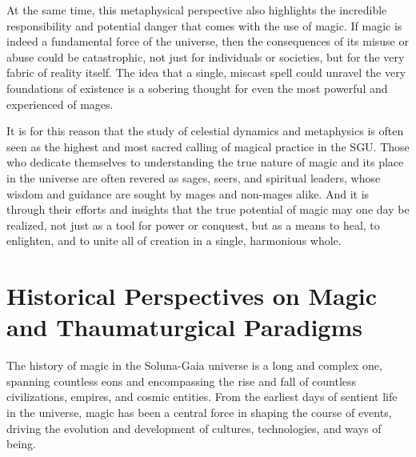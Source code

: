 \documentclass[12pt]{article}
\begin{document}
At the same time, this metaphysical perspective also highlights the incredible responsibility and potential danger that comes with the use of magic. If magic is indeed a fundamental force of the universe, then the consequences of its misuse or abuse could be catastrophic, not just for individuals or societies, but for the very fabric of reality itself. The idea that a single, miscast spell could unravel the very foundations of existence is a sobering thought for even the most powerful and experienced of mages.

It is for this reason that the study of celestial dynamics and metaphysics is often seen as the highest and most sacred calling of magical practice in the SGU. Those who dedicate themselves to understanding the true nature of magic and its place in the universe are often revered as sages, seers, and spiritual leaders, whose wisdom and guidance are sought by mages and non-mages alike. And it is through their efforts and insights that the true potential of magic may one day be realized, not just as a tool for power or conquest, but as a means to heal, to enlighten, and to unite all of creation in a single, harmonious whole.

\section{Historical Perspectives on Magic and Thaumaturgical Paradigms}

The history of magic in the Soluna-Gaia universe is a long and complex one, spanning countless eons and encompassing the rise and fall of countless civilizations, empires, and cosmic entities. From the earliest days of sentient life in the universe, magic has been a central force in shaping the course of events, driving the evolution and development of cultures, technologies, and ways of being.
\end{document}

